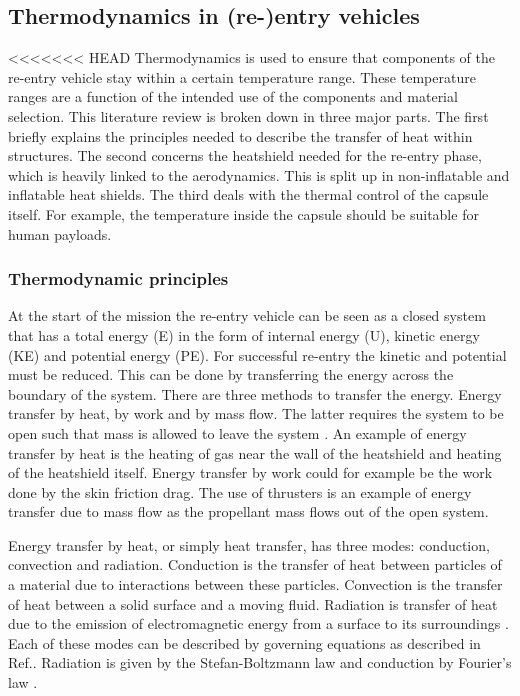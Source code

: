 \subsection{Thermodynamics in (re-)entry vehicles}\label{sec:thermo}
<<<<<<< HEAD
Thermodynamics is used to ensure that components of the re-entry vehicle stay within a certain temperature range. These temperature ranges are a function of the intended use of the components and material selection. This literature review is broken down in three major parts. The first briefly explains the principles needed to describe the transfer of heat within structures. The second concerns the heatshield needed for the re-entry phase, which is heavily linked to the aerodynamics. This is split up in non-inflatable and inflatable heat shields. The third deals with the thermal control of the capsule itself. For example, the temperature inside the capsule should be suitable for human payloads.

\subsubsection{Thermodynamic principles}
At the start of the mission the re-entry vehicle can be seen as a closed system that has a total energy (E) in the form of internal energy (U), kinetic energy (KE) and potential energy (PE). For successful re-entry the kinetic and potential must be reduced. This can be done by transferring the energy across the boundary of the system. There are three methods to transfer the energy. Energy transfer by heat, by work and by mass flow. The latter requires the system to be open such that mass is allowed to leave the system \cite{Cengel2010}. An example of energy transfer by heat is the heating of gas near the wall of the heatshield and heating of the heatshield itself. Energy transfer by work could for example be the work done by the skin friction drag. The use of thrusters is an example of energy transfer due to mass flow as the propellant mass flows out of the open system. 

Energy transfer by heat, or simply heat transfer, has three modes: conduction, convection and radiation. Conduction is the transfer of heat between particles of a material due to interactions between these particles. Convection is the transfer of heat between a solid surface and a moving fluid. Radiation is transfer of heat due to the emission of electromagnetic energy from a surface to its surroundings \cite{Cengel2010, Karam1998}. Each of these modes can be described by governing equations as described in Ref.\cite{Holman2002}. Radiation is given by the Stefan-Boltzmann law and conduction by Fourier's law \cite{Cengel2010, Holman2002}.


